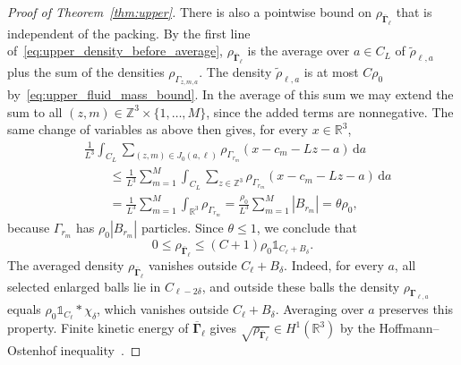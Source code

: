 \documentclass[final,reqno]{amsart}
\theoremstyle{remark}
\theoremstyle{definition}
\renewcommand{\le}{\leqslant}
\newcommand{\RR}{\mathbb{R}}
\newcommand{\ZZ}{\mathbb{Z}}
\newcommand{\iden}{\mathbb{1}}
\newcommand{\vGamma}{{\bm{\Gamma}}}
\begin{document}
\begin{proof}[Proof of Theorem~\ref{thm:upper}]
There is also a pointwise bound on $\rho_{\overline{\vGamma}_\ell}$ that is independent of the packing. By the first line of~\eqref{eq:upper_density_before_average}, $\rho_{\overline{\vGamma}_\ell}$ is the average over $a\in C_L$ of $\tilde\rho_{\ell,a}$ plus the sum of the densities $\rho_{\Gamma_{z,m,a}}$. The density $\tilde\rho_{\ell,a}$ is at most $C\rho_0$ by~\eqref{eq:upper_fluid_mass_bound}. In the average of this sum we may extend the sum to all $(z,m)\in\ZZ^3\times\{1,\dots,M\}$, since the added terms are nonnegative. The same change of variables as above then gives, for every $x\in\RR^3$,
\begin{align*}
&\frac1{L^3}\int_{C_L}\sum_{(z,m)\in J_0(a,\ell)}
\rho_{\Gamma_{r_m}}(x-c_m-Lz-a)\,\mathrm da\\
&\qquad\le\frac1{L^3}\sum_{m=1}^M\int_{C_L}\sum_{z\in\ZZ^3}\rho_{\Gamma_{r_m}}(x-c_m-Lz-a)\,\mathrm da\\
&\qquad=\frac1{L^3}\sum_{m=1}^M\int_{\RR^3}\rho_{\Gamma_{r_m}}
=\frac{\rho_0}{L^3}\sum_{m=1}^M|B_{r_m}|
=\theta\rho_0,
\end{align*}
because $\Gamma_{r_m}$ has $\rho_0|B_{r_m}|$ particles. Since $\theta\le1$, we conclude that
\begin{equation}\label{eq:upper_density_uniform_bound}
0\le \rho_{\overline{\vGamma}_\ell}\le(C+1)\rho_0\iden_{C_\ell+B_\delta}.
\end{equation}
The averaged density $\rho_{\overline{\vGamma}_\ell}$ vanishes outside $C_\ell+B_\delta$. Indeed, for every $a$, all selected enlarged balls lie in $C_{\ell-2\delta}$, and outside these balls the density $\rho_{\vGamma_{\ell,a}}$ equals $\rho_0\iden_{C_\ell}*\chi_\delta$, which vanishes outside $C_\ell+B_\delta$. Averaging over $a$ preserves this property. Finite kinetic energy of $\overline{\vGamma}_\ell$ gives $\sqrt{\rho_{\overline{\vGamma}_\ell}}\in H^1(\RR^3)$ by the Hoffmann--Ostenhof inequality~\cite{hoffmann1977schrodinger}.


\end{proof}
\end{document}
